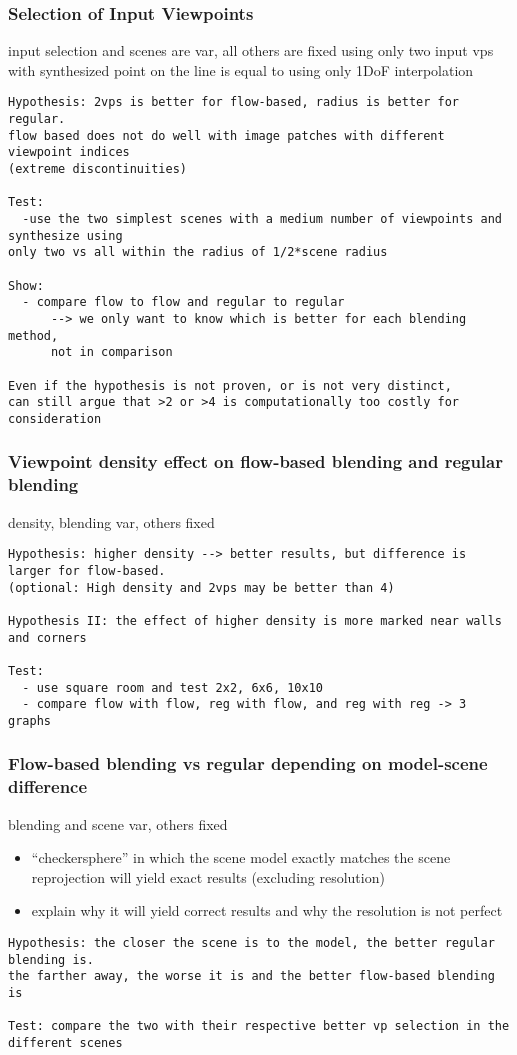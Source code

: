 \subsubsection{Selection of Input Viewpoints}
input selection and scenes are var, all others are fixed
using only two input vps with synthesized point on the line is equal to using only 1DoF interpolation
\begin{verbatim}
Hypothesis: 2vps is better for flow-based, radius is better for regular.
flow based does not do well with image patches with different viewpoint indices
(extreme discontinuities)

Test: 
  -use the two simplest scenes with a medium number of viewpoints and synthesize using
only two vs all within the radius of 1/2*scene radius

Show: 
  - compare flow to flow and regular to regular
      --> we only want to know which is better for each blending method,
      not in comparison

Even if the hypothesis is not proven, or is not very distinct,
can still argue that >2 or >4 is computationally too costly for consideration

\end{verbatim}

\subsubsection{Viewpoint density effect on flow-based blending and regular blending}
density, blending var, others fixed
\begin{verbatim}
Hypothesis: higher density --> better results, but difference is larger for flow-based.
(optional: High density and 2vps may be better than 4)

Hypothesis II: the effect of higher density is more marked near walls and corners

Test:
  - use square room and test 2x2, 6x6, 10x10
  - compare flow with flow, reg with flow, and reg with reg -> 3 graphs

\end{verbatim}

\subsubsection{Flow-based blending vs regular depending on model-scene difference}
blending and scene var, others fixed
\begin{itemize}
  \item ``checkersphere'' in which the scene model exactly matches the scene
    \ar reprojection will yield exact results (excluding resolution)
  \item explain why it will yield correct results and why the resolution is not perfect
\end{itemize}
\begin{verbatim}
Hypothesis: the closer the scene is to the model, the better regular blending is.
the farther away, the worse it is and the better flow-based blending is

Test: compare the two with their respective better vp selection in the different scenes

\end{verbatim}


